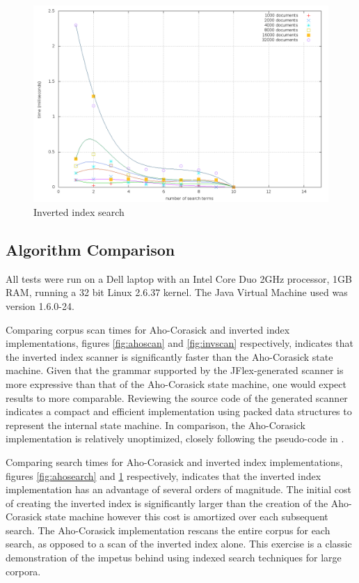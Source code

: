 \documentclass[10pt]{report}
\begin{document}
\begin{figure}
  \begin{center}
	\includegraphics[width=\textwidth,height=!]{invsearch}
  \end{center}
  \caption{Inverted index search}
  \label{fig:invsearch}
\end{figure} 

\subsection*{Algorithm Comparison}
\label{sec:algorithmcomparison}
All tests were run on a Dell laptop with an Intel Core Duo 2GHz
processor, 1GB RAM, running a 32 bit Linux 2.6.37 kernel. The Java
Virtual Machine used was version 1.6.0-24. 

Comparing corpus scan times for Aho-Corasick and inverted index
implementations, figures \ref{fig:ahoscan} and \ref{fig:invscan}
respectively, indicates that the inverted index scanner is
significantly faster than the Aho-Corasick state machine. Given that
the grammar supported by the JFlex-generated scanner is more expressive
than that of the Aho-Corasick state machine, one would expect results
to more comparable. Reviewing the source code of the generated scanner
indicates a compact and efficient implementation using packed data
structures to represent the internal state machine. In comparison, the
Aho-Corasick implementation is relatively unoptimized, closely
following the pseudo-code in \cite{RefWorks:103}.

Comparing search times for Aho-Corasick and inverted index
implementations, figures \ref{fig:ahosearch} and \ref{fig:invsearch}
respectively, indicates that the inverted index implementation has an
advantage of several orders of magnitude. The initial cost of creating
the inverted index is significantly larger than the creation of the
Aho-Corasick state machine however this cost is amortized over each
subsequent search. The Aho-Corasick implementation rescans the entire
corpus for each search, as opposed to a scan of the inverted index
alone. This exercise is a classic demonstration of the impetus behind
using indexed search techniques for large corpora.





\end{document}
